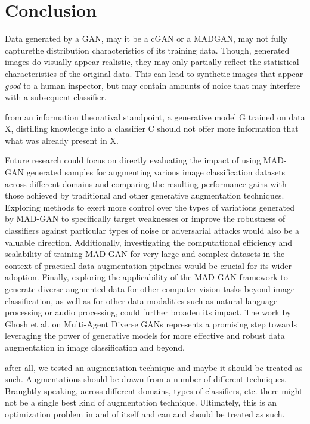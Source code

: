 \section{Conclusion}\label{conclusion}

Data generated by a GAN, may it be a cGAN or a MADGAN, may not fully capturethe distribution characteristics of its training data. Though, generated images do visually appear realistic, they may only partially reflect the statistical characteristics of the original data. This can lead to synthetic images that appear \textit{good} to a human inspector, but may contain amounts of noice that may interfere with a subsequent classifier.

from an information theoratival standpoint, a generative model G trained on data X, distilling knowledge into a classifier C should not offer more information that what was already present in X.


Future research could focus on directly evaluating the impact of using MAD-GAN generated samples for augmenting various image classification datasets across different domains and comparing the resulting performance gains with those achieved by traditional and other generative augmentation techniques. Exploring methods to exert more control over the types of variations generated by MAD-GAN to specifically target weaknesses or improve the robustness of classifiers against particular types of noise or adversarial attacks would also be a valuable direction. Additionally, investigating the computational efficiency and scalability of training MAD-GAN for very large and complex datasets in the context of practical data augmentation pipelines would be crucial for its wider adoption. Finally, exploring the applicability of the MAD-GAN framework to generate diverse augmented data for other computer vision tasks beyond image classification, as well as for other data modalities such as natural language processing or audio processing, could further broaden its impact. The work by Ghosh et al. on Multi-Agent Diverse GANs represents a promising step towards leveraging the power of generative models for more effective and robust data augmentation in image classification and beyond.


after all, we tested an augmentation technique and maybe it should be treated as such. Augmentations should be drawn from a number of different techniques. Braughtly speaking, across different domains, types of classifiers, etc. there might not be a single best kind of augmentation technique. Ultimately, this is an optimization problem in and of itself and can and should be treated as such. 